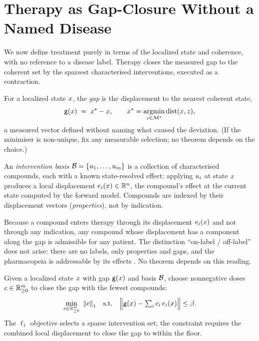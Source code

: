 \section{Therapy as Gap-Closure Without a Named Disease}
\label{cfc:sec:therapy}

We now define treatment purely in terms of the localized state and coherence,
with no reference to a disease label. Therapy closes the measured gap to the
coherent set by the sparsest characterised interventions, executed as a
contraction.

\begin{definition}[Gap]
\label{cfc:def:gap}
For a localized state $x$, the \emph{gap} is the displacement to the nearest
coherent state,
\begin{equation}
\mathsf{g}(x)\;=\;x^{\star}-x,\qquad x^{\star}=\operatorname*{argmin}_{z\in\mathcal{M}^{\star}}\operatorname{dist}(x,z),
\label{cfc:eq:gap}
\end{equation}
a measured vector defined without naming what caused the deviation. (If the
minimiser is non-unique, fix any measurable selection; no theorem depends on
the choice.)
\end{definition}

\begin{definition}
\label{cfc:def:basis}
An \emph{intervention basis} $\mathcal{B}=\{u_1,\dots,u_m\}$ is a
collection of characterised compounds, each with a known state-resolved effect:
applying $u_i$ at state $x$ produces a local displacement
$e_i(x)\in\mathbb{R}^n$, the compound's effect at the current state computed by the
forward model. Compounds are indexed by their displacement vectors
(\emph{properties}), not by indication.
\end{definition}

\begin{remark}
\label{cfc:rem:repurpose}
Because a compound enters therapy through its displacement $e_i(x)$ and not
through any indication, any compound whose displacement has a component along
the gap is admissible for any patient. The distinction
``on-label / off-label'' does not arise: there are no labels, only properties
and gaps, and the pharmacopeia is addressable by its effects
\citep{pushpakom2019drug}. No theorem depends on this reading.
\end{remark}

\begin{problem}
\label{cfc:prob:closure}
Given a localized state $x$ with gap $\mathsf{g}(x)$ and basis $\mathcal{B}$, choose
nonnegative doses $c\in\mathbb{R}_{\ge 0}^{m}$ to close the gap with the fewest compounds:
\begin{equation}
\min_{\dose\in\Rp^{m}}\ \norm{\dose}_1
\quad\text{s.t.}\quad
\Bigl\lVert\gap(\st)-\textstyle\sum_i \dose_i\,e_i(\st)\Bigr\rVert\le\flo.
\label{cfc:eq:closure}
\end{equation}
The $\ell_1$ objective selects a sparse intervention set; the constraint
requires the combined local displacement to close the gap to within the floor.
\end{problem}

